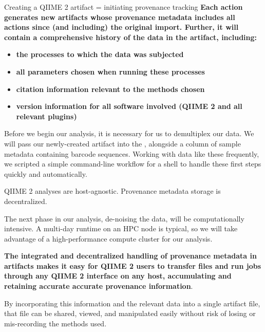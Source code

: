 \documentclass[final]{beamer}
\newlength{\colwidth}
\begin{document}
\begin{frame}[t]
\begin{columns}[t]
\begin{column}{\colwidth}
\begin{block}{Creating a QIIME 2 artifact = initiating provenance tracking}
   \textbf{Each action generates new artifacts whose provenance metadata includes all
   actions since (and including) the original import. Further, it will contain
   a comprehensive history of the data in the artifact, including:}

    \begin{itemize}
      \item \textbf{the processes to which the data was subjected}
      \item \textbf{all parameters chosen when running these processes}
      \item \textbf{citation information relevant to the methods chosen}
      \item \textbf{version information for all software involved (QIIME 2 and all relevant plugins)}
    \end{itemize}

    Before we begin our analysis, it is necessary for us to demultiplex our
    data. We will pass our newly-created artifact into the ,
    alongside a column of sample metadata containing barcode sequences. Working
    with data like these frequently, we scripted a simple command-line workflow
    for a shell to handle these first steps quickly and automatically. 

  \end{block}

  \begin{block}{QIIME 2 analyses are host-agnostic. Provenance metadata storage is decentralized.}

    The next phase in our analysis, de-noising the data, will be computationally
    intensive. A multi-day runtime on an HPC node is typical, so we will take
    advantage of a high-performance compute cluster for our analysis.


    \textbf{The integrated and decentralized handling of provenance metadata in
    artifacts makes it easy for QIIME 2 users to transfer files and run jobs
    through any QIIME 2 interface on any host, accumulating and retaining
    accurate accurate provenance information}.

    By incorporating this information and the relevant data into a single
    artifact file, that file can be shared, viewed, and manipulated easily
    without risk of losing or mis-recording the methods used.


\end{block}
\end{column}
\end{columns}
\end{frame}
\end{document}
